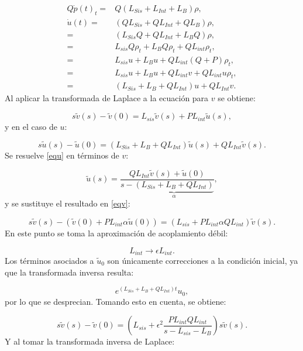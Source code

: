 \documentclass[a4paper,10pt]{report}
\begin{document}
\begin{align*}
Q\dot{p}(t)_t =& Q(L_{Sis}+L_{Int}+L_B)\rho, \\
 \dot{u}(t) =& (QL_{Sis}+QL_{Int}+QL_B)\rho, \\
 =&(L_{Sis}Q+QL_{Int}+L_BQ)\rho, \\
 =& L_{sis}Q\rho_t + L_{B}Q\rho_t + QL_{int}\rho_t, \\
 =& L_{sis}u + L_{B}u + QL_{int}(Q+P)\rho_t,  \\
 =& L_{sis}u + L_{B}u + QL_{int}v+QL_{int}u\rho_t, \\
 =& (L_{Sis}+L_B+QL_{Int})u +QL_{Int}v. 
\end{align*} Al aplicar la transformada de Laplace a la ecuación para $v$ se obtiene:

\begin{equation}\label{eqv}
s\tilde{v}(s)-\tilde{v}(0) = L_{sis}\tilde{v}(s) + PL_{int}\tilde{u}(s),
\end{equation} y en el caso de $u$:

\begin{equation}\label{equ}
s\tilde{u}(s)-\tilde{u}(0) = (L_{Sis}+L_B+QL_{Int})\tilde{u}(s) + QL_{Int}\tilde{v}(s).
\end{equation} Se resuelve \eqref{equ} en términos de $v$:

\begin{equation}
\tilde{u}(s)=\frac{QL_{Int}\tilde{v}(s)+\tilde{u}(0)}{s-\underbrace{(L_{Sis}+L_B+QL_{Int})}_\alpha},
\end{equation} y se sustituye el resultado en \eqref{eqv}:

\begin{equation}
s\tilde{v}(s)-(\tilde{v}(0)+PL_{int}\alpha\tilde{u}(0))=(L_{sis}+PL_{int}\alpha QL_{int})\tilde{v}(s).
\end{equation} En este punto se toma la aproximación de acoplamiento débil:

\begin{equation}
L_{int} \rightarrow \epsilon L_{int}.
\end{equation} Los términos asociados a $\tilde{u}_0$ son únicamente correcciones a la condición inicial, ya que la transformada inversa resulta:

\begin{equation}
e^{(L_{Sis}+L_B+QL_{Int})t}u_0,
\end{equation} por lo que se desprecian. Tomando esto en cuenta, se obtiene:

\begin{equation}
s\tilde{v}(s)-\tilde{v}(0) = (L_{sis}+\epsilon^2\frac{PL_{int}QL_{int}}{s-L_{sis}-L_{B}})s\tilde{v}(s).
\end{equation} Y al tomar la transformada inversa de Laplace:
\end{document}
